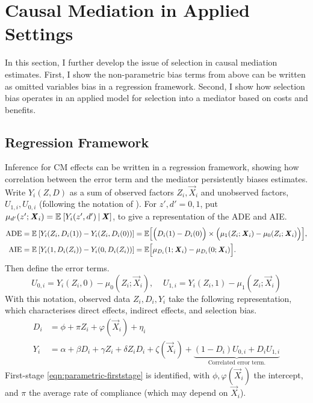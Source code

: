 \section{Causal Mediation in Applied Settings}
\label{sec:selection}
In this section, I further develop the issue of selection in causal mediation estimates. First, I show the non-parametric bias terms from above can be written as omitted variables bias in a regression framework.
Second, I show how selection bias operates in an applied model for selection into a mediator based on costs and benefits.

\subsection{Regression Framework}
\label{sec:regression}
Inference for CM effects can be written in a regression framework, showing how correlation between the error term and the mediator persistently biases estimates.
Write $Y_i(Z, D)$ as a sum of observed factors $Z_i, \vec X_i$ and unobserved factors, $U_{1,i}, U_{0,i}$ (following the notation of \citealt{heckman2005structural}).
For $z',d' = 0,1$, put $\mu_{d'}(z'; \boldsymbol{\mathit{X}}_i) = \mathbb{E}_{} \left[ Y_i(z', d') \, \middle\vert \, \boldsymbol{\mathit{X}} \right]$, to give a representation of the ADE and AIE.
\begin{align*}
    \text{ADE}
    = \mathbb{E}_{} \left[ Y_i(Z_i, D_i(1)) - Y_i(Z_i, D_i(0)) \right]
    &= \mathbb{E} \Big[ \Big( D_i(1) - D_i(0) \Big)
        \times \Big( \mu_1(Z_i; \boldsymbol{\mathit{X}}_i) - \mu_0(Z_i; \boldsymbol{\mathit{X}}_i) \Big) \Big], \\
    \text{AIE}    
    = \mathbb{E}_{} \left[ Y_i(1, D_i(Z_i)) - Y_i(0, D_i(Z_i)) \right]
        &= \mathbb{E} \Big[ \mu_{D_i}(1; \boldsymbol{\mathit{X}}_i) - \mu_{D_i}(0; \boldsymbol{\mathit{X}}_i) \Big].
\end{align*}
Then define the error terms.
\[ U_{0,i} = Y_i(Z_i, 0) - \mu_0(Z_i; \vec X_i),\;\;\;\;
U_{1,i} = Y_i(Z_i, 1) - \mu_1(Z_i; \vec X_i) \]
With this notation, observed data $Z_i, D_i, Y_i$ take the following representation, which characterises direct effects, indirect effects, and selection bias.
\begin{align}
    \label{eqn:parametric-firststage}
    D_i &= \phi + \pi Z_i + \varphi(\vec X_i) + \eta_i  \\
    \label{eqn:parametric-secondstage}
    Y_i &= \alpha + \beta D_i + \gamma Z_i + \delta Z_i D_i
    + \zeta(\vec X_i)
    + \underbrace{\left(1 - D_i \right)U_{0,i} + D_i U_{1,i}}_{
        \text{Correlated error term.}}
\end{align}
First-stage \eqref{eqn:parametric-firststage} is identified, with $\phi, \varphi(\vec X_i)$ the intercept, and $\pi$ the average rate of compliance (which may depend on $\vec X_i$).
